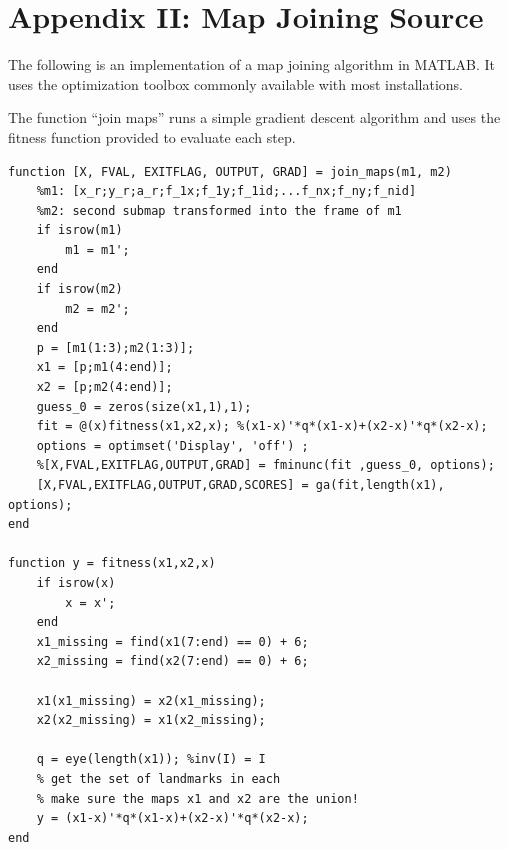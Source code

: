 \documentclass[12pt]{report}
\begin{document}
\chapter{Appendix II: Map Joining Source}
The following is an implementation of a map joining algorithm in
MATLAB.  It uses the optimization toolbox commonly available with most
installations.

The function ``join maps'' runs a simple gradient descent algorithm
and uses the fitness function provided to evaluate each step.

\singlespacing
\begin{verbatim}
function [X, FVAL, EXITFLAG, OUTPUT, GRAD] = join_maps(m1, m2)
    %m1: [x_r;y_r;a_r;f_1x;f_1y;f_1id;...f_nx;f_ny;f_nid]
    %m2: second submap transformed into the frame of m1
    if isrow(m1)
        m1 = m1';
    end
    if isrow(m2)
        m2 = m2';
    end
    p = [m1(1:3);m2(1:3)];
    x1 = [p;m1(4:end)];
    x2 = [p;m2(4:end)];
    guess_0 = zeros(size(x1,1),1);
    fit = @(x)fitness(x1,x2,x); %(x1-x)'*q*(x1-x)+(x2-x)'*q*(x2-x);
    options = optimset('Display', 'off') ;
    %[X,FVAL,EXITFLAG,OUTPUT,GRAD] = fminunc(fit ,guess_0, options);
    [X,FVAL,EXITFLAG,OUTPUT,GRAD,SCORES] = ga(fit,length(x1), options);
end

function y = fitness(x1,x2,x)
    if isrow(x)
        x = x';
    end
    x1_missing = find(x1(7:end) == 0) + 6;
    x2_missing = find(x2(7:end) == 0) + 6;
    
    x1(x1_missing) = x2(x1_missing);
    x2(x2_missing) = x1(x2_missing);
    
    q = eye(length(x1)); %inv(I) = I
    % get the set of landmarks in each
    % make sure the maps x1 and x2 are the union!
    y = (x1-x)'*q*(x1-x)+(x2-x)'*q*(x2-x);
end



\end{verbatim}
\doublespacing
\end{document}
